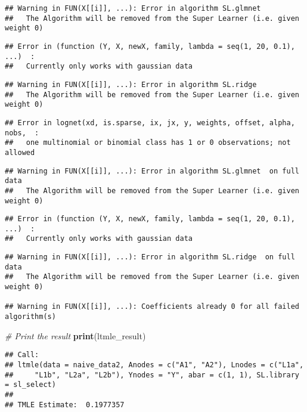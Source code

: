 \documentclass[
]{article}
\newenvironment{Shaded}{\begin{snugshade}}{\end{snugshade}}
\newcommand{\CommentTok}[1]{\textcolor[rgb]{0.56,0.35,0.01}{\textit{#1}}}
\newcommand{\FunctionTok}[1]{\textcolor[rgb]{0.13,0.29,0.53}{\textbf{#1}}}
\newcommand{\NormalTok}[1]{#1}
\begin{document}
\begin{verbatim}
## Warning in FUN(X[[i]], ...): Error in algorithm SL.glmnet 
##   The Algorithm will be removed from the Super Learner (i.e. given weight 0)
\end{verbatim}

\begin{verbatim}
## Error in (function (Y, X, newX, family, lambda = seq(1, 20, 0.1), ...)  : 
##   Currently only works with gaussian data
\end{verbatim}

\begin{verbatim}
## Warning in FUN(X[[i]], ...): Error in algorithm SL.ridge 
##   The Algorithm will be removed from the Super Learner (i.e. given weight 0)
\end{verbatim}

\begin{verbatim}
## Error in lognet(xd, is.sparse, ix, jx, y, weights, offset, alpha, nobs,  : 
##   one multinomial or binomial class has 1 or 0 observations; not allowed
\end{verbatim}

\begin{verbatim}
## Warning in FUN(X[[i]], ...): Error in algorithm SL.glmnet  on full data 
##   The Algorithm will be removed from the Super Learner (i.e. given weight 0)
\end{verbatim}

\begin{verbatim}
## Error in (function (Y, X, newX, family, lambda = seq(1, 20, 0.1), ...)  : 
##   Currently only works with gaussian data
\end{verbatim}

\begin{verbatim}
## Warning in FUN(X[[i]], ...): Error in algorithm SL.ridge  on full data 
##   The Algorithm will be removed from the Super Learner (i.e. given weight 0)

## Warning in FUN(X[[i]], ...): Coefficients already 0 for all failed algorithm(s)
\end{verbatim}

\begin{Shaded}
\begin{Highlighting}[]
\CommentTok{\# Print the result}
\FunctionTok{print}\NormalTok{(ltmle\_result)}
\end{Highlighting}
\end{Shaded}

\begin{verbatim}
## Call:
## ltmle(data = naive_data2, Anodes = c("A1", "A2"), Lnodes = c("L1a", 
##     "L1b", "L2a", "L2b"), Ynodes = "Y", abar = c(1, 1), SL.library = sl_select)
## 
## TMLE Estimate:  0.1977357
\end{verbatim}
\end{document}

